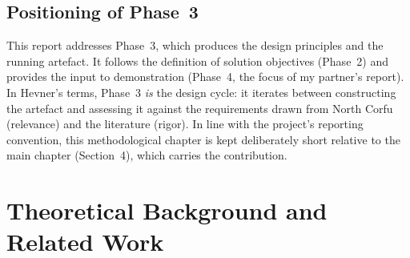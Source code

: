 \documentclass[11pt,a4paper]{article}
\begin{document}
\subsection{Positioning of Phase~3}

This report addresses Phase~3, which produces the design principles and the running artefact. It follows the definition of solution objectives (Phase~2) and provides the input to demonstration (Phase~4, the focus of my partner's report). In Hevner's terms, Phase~3 \emph{is} the design cycle: it iterates between constructing the artefact and assessing it against the requirements drawn from North Corfu (relevance) and the literature (rigor). In line with the project's reporting convention, this methodological chapter is kept deliberately short relative to the main chapter (Section~4), which carries the contribution.

\section{Theoretical Background and Related Work}
\end{document}
